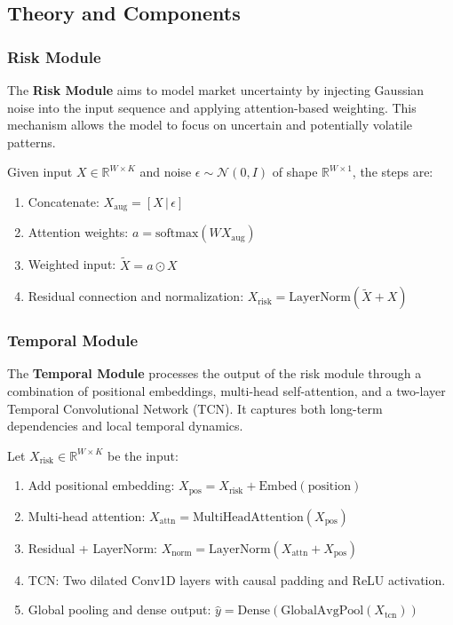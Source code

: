 \subsection{Theory and Components}

\subsubsection{Risk Module}

The \textbf{Risk Module} aims to model market uncertainty by injecting Gaussian noise into the input sequence and applying attention-based weighting. This mechanism allows the model to focus on uncertain and potentially volatile patterns.

Given input $X \in \mathbb{R}^{W \times K}$ and noise $\epsilon \sim \mathcal{N}(0, I)$ of shape $\mathbb{R}^{W \times 1}$, the steps are:
\begin{enumerate}
    \item Concatenate: $X_{\text{aug}} = [X \, | \, \epsilon]$
    \item Attention weights: $a = \text{softmax}(WX_{\text{aug}})$
    \item Weighted input: $\tilde{X} = a \odot X$
    \item Residual connection and normalization: $X_{\text{risk}} = \text{LayerNorm}(\tilde{X} + X)$
\end{enumerate}

\subsubsection{Temporal Module}

The \textbf{Temporal Module} processes the output of the risk module through a combination of positional embeddings, multi-head self-attention, and a two-layer Temporal Convolutional Network (TCN). It captures both long-term dependencies and local temporal dynamics.

Let $X_{\text{risk}} \in \mathbb{R}^{W \times K}$ be the input:
\begin{enumerate}
    \item Add positional embedding: $X_{\text{pos}} = X_{\text{risk}} + \text{Embed}(\text{position})$
    \item Multi-head attention: $X_{\text{attn}} = \text{MultiHeadAttention}(X_{\text{pos}})$
    \item Residual + LayerNorm: $X_{\text{norm}} = \text{LayerNorm}(X_{\text{attn}} + X_{\text{pos}})$
    \item TCN: Two dilated Conv1D layers with causal padding and ReLU activation.
    \item Global pooling and dense output: $\hat{y} = \text{Dense}( \text{GlobalAvgPool}(X_{\text{tcn}}) )$
\end{enumerate}

